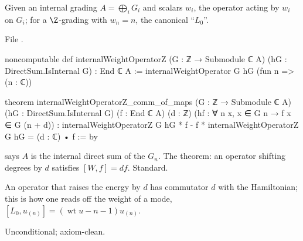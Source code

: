 \begin{definition}\label{l04:def:intweight}
Given an internal grading $A = \bigoplus_iG_i$ and scalars $w_i$, the operator acting by $w_i$ on $G_i$;
for a $\Z$-grading with $w_n = n$, the canonical ``$L_0$''.
\end{definition}
\noindent File .
\begin{leancode}
noncomputable def internalWeightOperatorZ (G : ℤ → Submodule ℂ A)
    (hG : DirectSum.IsInternal G) : End ℂ A :=
  internalWeightOperator G hG (fun n => (n : ℂ))

theorem internalWeightOperatorZ_comm_of_maps
    (G : ℤ → Submodule ℂ A) (hG : DirectSum.IsInternal G)
    (f : End ℂ A) (d : ℤ)
    (hf : ∀ n x, x ∈ G n → f x ∈ G (n + d)) :
    internalWeightOperatorZ G hG * f - f * internalWeightOperatorZ G hG =
      (d : ℂ) • f := by
\end{leancode}
\begin{dictionary}
 says $A$ is the internal direct sum of the $G_n$. The theorem: an operator
shifting degrees by $d$ satisfies $[W,f] = d f$. Standard.
\end{dictionary}
\begin{physics}
An operator that raises the energy by $d$ has commutator $d$ with the Hamiltonian; this is how one
reads off the weight of a mode, $[L_0,u_{(n)}] = (\operatorname{wt}u-n-1)u_{(n)}$.
\end{physics}
\begin{status}
Unconditional; axiom-clean.
\end{status}

